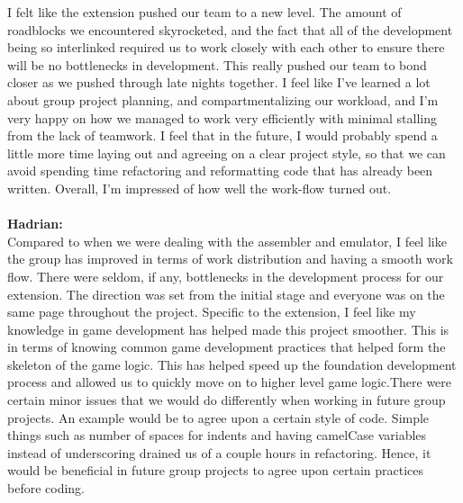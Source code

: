 \documentclass[a4paper]{article}
\begin{document}
I felt like the extension pushed our team to a new level. The amount of roadblocks we encountered skyrocketed, and the fact that all of the development being so interlinked required us to work closely with each other to ensure there will be no bottlenecks in development. This really pushed our team to bond closer as we pushed through late nights together. I feel like I've learned a lot about group project planning, and compartmentalizing our workload, and I'm very happy on how we managed to work very efficiently with minimal stalling from the lack of teamwork. I feel that in the future, I would probably spend a little more time laying out and agreeing on a clear project style, so that we can avoid spending time refactoring and reformatting code that has already been written. Overall, I'm impressed of how well the work-flow turned out.\\
\\
\textbf{Hadrian:}\\
Compared to when we were dealing with the assembler and emulator, I feel like the group has improved in terms of work distribution and having a smooth work flow. There were seldom, if any, bottlenecks in the development process for our extension. The direction was set from the initial stage and everyone was on the same page throughout the project. Specific to the extension, I feel like my knowledge in game development has helped made this project smoother. This is in terms of knowing common game development practices that helped form the skeleton of the game logic. This has helped speed up the foundation development process and allowed us to quickly move on to higher level game logic.There were certain minor issues that we would do differently when working in future group projects. An example would be to agree upon a certain style of code. Simple things such as number of spaces for indents and having camelCase variables instead of underscoring drained us of a couple hours in refactoring. Hence, it would be beneficial in future group projects to agree upon certain practices before coding.
\end{document}
